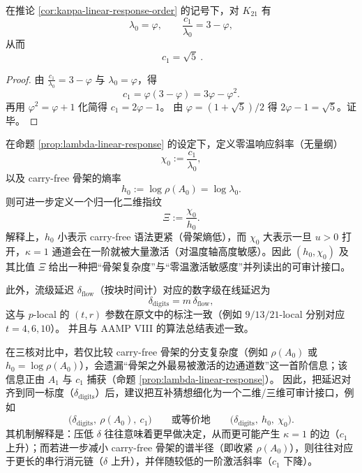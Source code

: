 \begin{corollary}\label{cor:k21-c1-sqrt5}
在推论 \ref{cor:kappa-linear-response-order} 的记号下，对 \(K_{21}\) 有
\[
\lambda_0=\varphi,\qquad \frac{c_1}{\lambda_0}=3-\varphi,
\]
从而
\[
\boxed{\ c_1=\sqrt5\ }.
\]
\end{corollary}
\begin{proof}
由 \(\frac{c_1}{\lambda_0}=3-\varphi\) 与 \(\lambda_0=\varphi\)，得
\[
c_1=\varphi(3-\varphi)=3\varphi-\varphi^2.
\]
再用 \(\varphi^2=\varphi+1\) 化简得
\(
c_1=2\varphi-1
\)。
由 \(\varphi=(1+\sqrt5)/2\) 得 \(2\varphi-1=\sqrt5\)。证毕。
\end{proof}

\begin{remark}\label{rem:zero-temp-two-scales}
在命题 \ref{prop:lambda-linear-response} 的设定下，定义零温响应斜率（无量纲）
$$
\chi_0:=\frac{c_1}{\lambda_0},
$$
以及 carry-free 骨架的熵率
$$
h_0:=\log\rho(A_0)=\log\lambda_0.
$$
则可进一步定义一个归一化二维指纹
$$
\Xi:=\frac{\chi_0}{h_0}.
$$
解释上，\(h_0\) 小表示 carry-free 语法更紧（骨架熵低），而 \(\chi_0\) 大表示一旦 \(u>0\) 打开，\(\kappa=1\) 通道会在一阶就被大量激活（对温度轴高度敏感）。因此 \((h_0,\chi_0)\) 及其比值 \(\Xi\) 给出一种把“骨架复杂度”与“零温激活敏感度”并列读出的可审计接口。
\end{remark}

此外，流级延迟 $\delta_{\mathrm{flow}}$（按块时间计）对应的数字级在线延迟为
\[
\delta_{\mathrm{digits}}=m\,\delta_{\mathrm{flow}},
\]
这与 $p$-local 的 $(t,r)$ 参数在原文中的标注一致（例如 $9/13/21$-local 分别对应 $t=4,6,10$）。\cite{FrougnyHellerPelantovaSvobodovaParallelAlgorithmsSlides,Frougny2012NumbersAsStreamsLeiden}
并且与 AAMP VIII 的算法总结表述一致。 \cite{SvobodovaAAMPVIIIParallelAddition}

\begin{remark}\label{rem:entropy-delay-complement-c1}
在三核对比中，若仅比较 carry-free 骨架的分支复杂度（例如 \(\rho(A_0)\) 或 \(h_0=\log\rho(A_0)\)），会遗漏“骨架之外最易被激活的边通道数”这一首阶信息；该信息正由 \(A_1\) 与 \(c_1\) 捕获（命题 \ref{prop:lambda-linear-response}）。
因此，把延迟对齐到同一标度（\(\delta_{\mathrm{digits}}\)）后，建议把互补猜想细化为一个二维/三维可审计接口，例如
$$
\bigl(\delta_{\mathrm{digits}},\ \rho(A_0),\ c_1\bigr)
\qquad\text{或等价地}\qquad
\bigl(\delta_{\mathrm{digits}},\ h_0,\ \chi_0\bigr).
$$
其机制解释是：压低 \(\delta\) 往往意味着更早做决定，从而更可能产生 \(\kappa=1\) 的边（\(c_1\) 上升）；而若进一步减小 carry-free 骨架的谱半径（即收紧 \(\rho(A_0)\)），则往往对应于更长的串行消元链（\(\delta\) 上升），并伴随较低的一阶激活斜率（\(c_1\) 下降）。
\end{remark}

